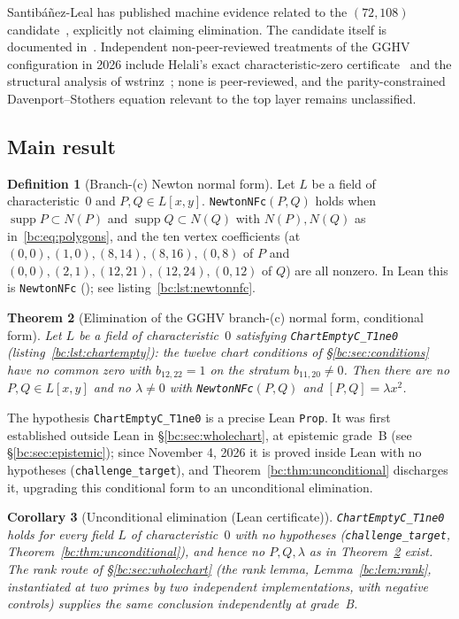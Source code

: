 \documentclass[a4paper,11pt]{article}
\newcommand{\filename}[1]{\texttt{\seqsplit{#1}}}
\theoremstyle{plain}
\newtheorem{theorem}{Theorem}[section]
\newtheorem{corollary}[theorem]{Corollary}
\theoremstyle{definition}
\newtheorem{definition}[theorem]{Definition}
\theoremstyle{remark}
\begin{document}
Santib\'a\~nez-Leal has published machine evidence related to the $(72,108)$ candidate~\cite{Santibanez,SantibanezPaper}, explicitly not claiming elimination. The candidate itself is documented in~\cite{JC125note}. Independent non-peer-reviewed treatments of the GGHV configuration in 2026 include Helali's exact characteristic-zero certificate~\cite{Helali} and the structural analysis of wstrinz~\cite{wstrinz}; none is peer-reviewed, and the parity-constrained Davenport--Stothers equation relevant to the top layer remains unclassified.

\subsection{Main result}

\begin{definition}[Branch-(c) Newton normal form]\label{bc:def:newtonnfc}
Let $L$ be a field of characteristic~$0$ and $P,Q\in L[x,y]$. \texttt{NewtonNFc}$(P,Q)$ holds when $\operatorname{supp}P\subset N(P)$ and $\operatorname{supp}Q\subset N(Q)$ with $N(P),N(Q)$ as in~\eqref{bc:eq:polygons}, and the ten vertex coefficients (at $(0,0),(1,0),(8,14),(8,16),(0,8)$ of $P$ and $(0,0),(2,1),(12,21),(12,24),(0,12)$ of $Q$) are all nonzero. In Lean this is \texttt{NewtonNFc} (\filename{Jacobian/BranchC/DescentClaim.lean}); see listing~\ref{bc:lst:newtonnfc}.
\end{definition}

\begin{theorem}[Elimination of the GGHV branch-(c) normal form, conditional form]\label{bc:thm:main}
Let $L$ be a field of characteristic~$0$ satisfying \texttt{ChartEmptyC\_T1ne0} (listing~\ref{bc:lst:chartempty}): the twelve chart conditions of \S\ref{bc:sec:conditions} have no common zero with $b_{12,22}=1$ on the stratum $b_{11,20}\ne0$. Then there are no $P,Q\in L[x,y]$ and no $\lambda\ne0$ with \texttt{NewtonNFc}$(P,Q)$ and $[P,Q]=\lambda x^2$.
\end{theorem}

The hypothesis \texttt{ChartEmptyC\_T1ne0} is a precise Lean \texttt{Prop}. It was first established outside Lean in \S\ref{bc:sec:wholechart}, at epistemic grade~B (see \S\ref{bc:sec:epistemic}); since November 4, 2026 it is proved inside Lean with no hypotheses (\texttt{challenge\_target}), and Theorem~\ref{bc:thm:unconditional} discharges it, upgrading this conditional form to an unconditional elimination.

\begin{corollary}[Unconditional elimination (Lean certificate)]\label{bc:cor:unconditional}
\texttt{ChartEmptyC\_T1ne0} holds for every field $L$ of characteristic~$0$ with no hypotheses (\texttt{challenge\_target}, Theorem~\ref{bc:thm:unconditional}), and hence no $P,Q,\lambda$ as in Theorem~\ref{bc:thm:main} exist. The rank route of \S\ref{bc:sec:wholechart} (the rank lemma, Lemma~\ref{bc:lem:rank}, instantiated at two primes by two independent implementations, with negative controls) supplies the same conclusion independently at grade~B.
\end{corollary}
\end{document}
